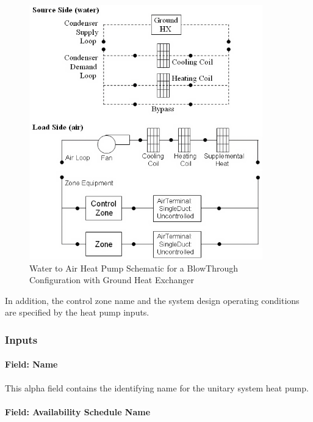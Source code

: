 \begin{figure}[hbtp] %
\centering
\includegraphics[width=0.9\textwidth, height=0.9\textheight, keepaspectratio=true]{media/image304.png}
\caption{Water to Air Heat Pump Schematic for a BlowThrough Configuration with Ground Heat Exchanger \protect \label{fig:water-to-air-heat-pump-schematic-for-a}}
\end{figure}

In addition, the control zone name and the system design operating conditions are specified by the heat pump inputs.

\subsubsection{Inputs}\label{inputs-7-029}

\paragraph{Field: Name}\label{field-name-8-023}

This alpha field contains the identifying name for the unitary system heat pump.

\paragraph{Field: Availability Schedule Name}\label{field-availability-schedule-name-7-004}

